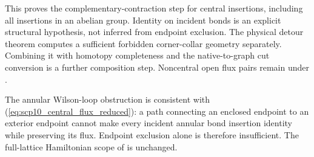 \documentclass{article}
\begin{document}
This proves the complementary-contraction step for central insertions,
including all insertions in an abelian group. Identity on incident bonds
is an explicit structural hypothesis, not inferred from endpoint
exclusion. The physical detour theorem computes a sufficient forbidden
corner-collar geometry separately. Combining it with homotopy completeness
and the native-to-graph cut conversion is a further composition step.
Noncentral open flux pairs remain under .

The annular Wilson-loop obstruction is consistent with
(\ref{eq:scp10_central_flux_reduced}): a path connecting an enclosed endpoint
to an exterior endpoint cannot make every incident annular bond insertion
identity while preserving its flux. Endpoint exclusion alone is therefore
insufficient. The full-lattice Hamiltonian scope of  is unchanged.


\end{document}
